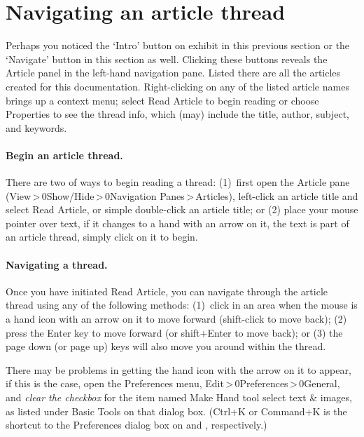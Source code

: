 \documentclass{article}
\begin{document}
\section{Navigating an article thread}

%

\begin{multicols}{2}
\noindent\makebox[0pt][r]{\showArtPanel[Navigate]\kern11bp}%
%
\noindent Perhaps you noticed the `Intro' button on exhibit in this previous
section or the `Navigate' button in this section as well. Clicking these
buttons reveals the \textsf{Article} panel in the left-hand navigation pane.
Listed there are all the articles created for this documentation.
Right-clicking on any of the listed article names brings up a context menu;
select \textsf{Read Article} to begin reading or choose \textsf{Properties}
to see the thread info, which (may) include the title, author, subject, and
keywords.

\paragraph*{Begin an article thread.} There are two of ways to begin
reading a thread: (1)~first open the \textsf{Article} pane
(\textsf{View\,>\,\penalty0Show/Hide\,>\,\penalty0Navigation
Panes\,>\,Articles}), left-click an article title and select \textsf{Read
Article}, or simple double-click an article title; or (2) place your mouse
pointer over text, if it changes to a hand with an arrow on it, the text is
part of an article thread, simply click on it to begin.

\paragraph*{Navigating a thread.} Once you have initiated \textsf{Read
Article}, you can navigate through the article thread using any of the
following methods: (1)~click in
an area when the mouse is a hand icon with an arrow on it to move forward
(shift-click to move back); (2) press the \textsf{Enter} key to move forward
(or shift+\textsf{Enter} to move back); or (3) the page down (or page up)
keys will also move you around within the thread.

There may be problems in getting the hand icon with the arrow on it to
appear, if this is the case, open the \textsf{Preferences} menu,
\textsf{Edit\,>\,\penalty0Preferences\,>\,\penalty0General}, and \emph{clear
the checkbox} for the item named \textsf{Make Hand tool select text \&
images}, as listed under \textsf{Basic Tools} on that dialog box.
(\textsf{Ctrl+K} or \textsf{Command+K} is the shortcut to the Preferences
dialog box on  and , respectively.)


\end{multicols}
\end{document}
